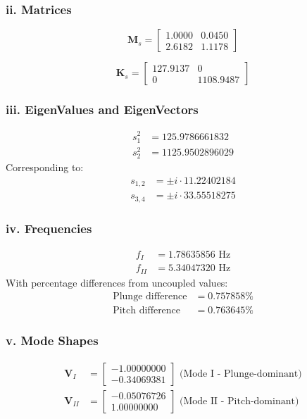 \documentclass{article}
\begin{document}
    \subsubsection{ii. Matrices}
\begin{equation}
\mathbf{M}_s = \begin{bmatrix}
1.0000 & 0.0450 \\
2.6182 & 1.1178
\end{bmatrix}
\end{equation}

\begin{equation}
\mathbf{K}_s = \begin{bmatrix}
127.9137 & 0 \\
0 & 1108.9487
\end{bmatrix}
\end{equation}

\subsubsection{iii. EigenValues and EigenVectors}

\begin{align}
s_1^2 &= 125.9786661832 \\
s_2^2 &= 1125.9502896029
\end{align}
Corresponding to:
\begin{align}
s_{1,2} &= \pm i \cdot 11.22402184 \\
s_{3,4} &= \pm i \cdot 33.55518275
\end{align}

\subsubsection{iv. Frequencies}
\begin{align}
f_I &= 1.78635856 \text{ Hz} \\
f_{II} &= 5.34047320 \text{ Hz}
\end{align}
With percentage differences from uncoupled values:
\begin{align}
\text{Plunge difference} &= 0.757858\% \\
\text{Pitch difference} &= 0.763645\%
\end{align}

\subsubsection{v. Mode Shapes}
\begin{align}
\mathbf{V}_I &= \begin{bmatrix} -1.00000000 \\ -0.34069381 \end{bmatrix} \text{ (Mode I - Plunge-dominant)} \\
\mathbf{V}_{II} &= \begin{bmatrix} -0.05076726 \\ 1.00000000 \end{bmatrix} \text{ (Mode II - Pitch-dominant)}
\end{align}
\end{document}
